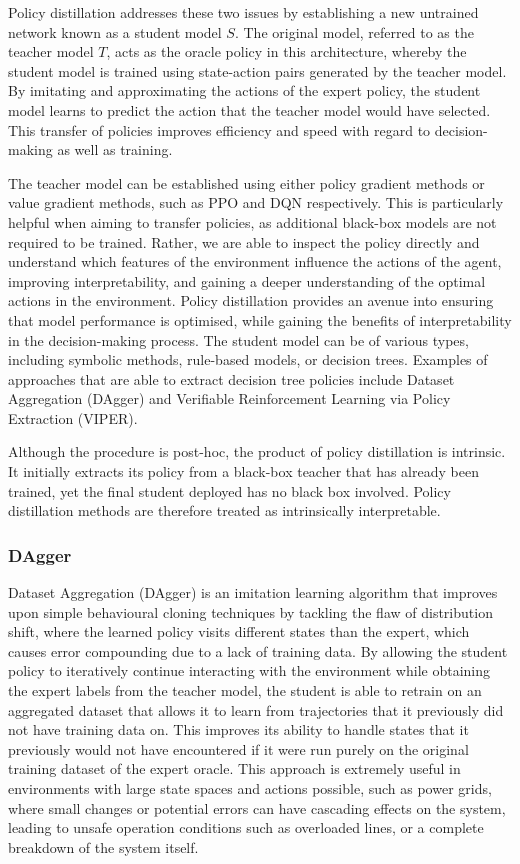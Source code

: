 Policy distillation \cite{rusu2015policy} addresses these two issues by establishing a new untrained network known as a student model $S$. The original model, referred to as the teacher model $T$, acts as the oracle policy in this architecture, whereby the student model is trained using state-action pairs generated by the teacher model. By imitating and approximating the actions of the expert policy, the student model learns to predict the action that the teacher model would have selected. This transfer of policies improves efficiency and speed with regard to decision-making as well as training.

The teacher model can be established using either policy gradient methods or value gradient methods, such as PPO and DQN respectively. This is particularly helpful when aiming to transfer policies, as additional black-box models are not required to be trained. Rather, we are able to inspect the policy directly and understand which features of the environment influence the actions of the agent, improving interpretability, and gaining a deeper understanding of the optimal actions in the environment. Policy distillation provides an avenue into ensuring that model performance is optimised, while gaining the benefits of interpretability in the decision-making process. The student model can be of various types, including symbolic methods, rule-based models, or decision trees. Examples of approaches that are able to extract decision tree policies include Dataset Aggregation (DAgger) and Verifiable Reinforcement Learning via Policy Extraction (VIPER).

Although the procedure is post-hoc, the product of policy distillation is intrinsic. It initially extracts its policy from a black-box teacher that has already been trained, yet the final student deployed has no black box involved. Policy distillation methods are therefore treated as intrinsically interpretable.

\subsubsection{DAgger}

Dataset Aggregation (DAgger) \cite{ross2011reduction} is an imitation learning algorithm that improves upon simple behavioural cloning techniques by tackling the flaw of distribution shift, where the learned policy visits different states than the expert, which causes error compounding due to a lack of training data. By allowing the student policy to iteratively continue interacting with the environment while obtaining the expert labels from the teacher model, the student is able to retrain on an aggregated dataset that allows it to learn from trajectories that it previously did not have training data on. This improves its ability to handle states that it previously would not have encountered if it were run purely on the original training dataset of the expert oracle. This approach is extremely useful in environments with large state spaces and actions possible, such as power grids, where small changes or potential errors can have cascading effects on the system, leading to unsafe operation conditions such as overloaded lines, or a complete breakdown of the system itself.

